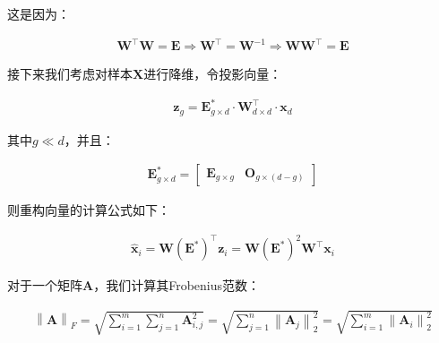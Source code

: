 \documentclass[UTF8]{book}
\begin{document}
这是因为：
\begin{large}
    \begin{equation}
        \begin{aligned}
            \mathbf{W}^\top\mathbf{W}=\mathbf{E} \Rightarrow \mathbf{W}^\top=\mathbf{W}^{-1} \Rightarrow \mathbf{W}\mathbf{W}^\top=\mathbf{E}
        \end{aligned}
    \end{equation}
\end{large}
接下来我们考虑对样本$\mathbf{X}$进行降维，令投影向量：
\begin{large}
    \begin{equation}
        \begin{aligned}
            \mathbf{z}_{g}=\mathbf{E}_{g \times d}^* \cdot \mathbf{W}_{d\times d}^\top \cdot \mathbf{x}_{d}
        \end{aligned}
    \end{equation}
\end{large}
其中$g \ll d$，并且：
\begin{large}
    \begin{equation}
        \begin{aligned}
            \mathbf{E}_{g\times d}^*=\begin{bmatrix}
            \mathbf{E}_{g\times g} & \mathbf{O}_{g\times (d-g)}
            \end{bmatrix}
            \nonumber
        \end{aligned}
    \end{equation}
\end{large}
则重构向量的计算公式如下：
\begin{large}
    \begin{equation}
        \begin{aligned}
            \hat{\mathbf{x}}_i=\mathbf{W} \left(\mathbf{E}^*\right)^\top \mathbf{z}_i = \mathbf{W}(\mathbf{E}^*)^2\mathbf{W}^\top \mathbf{x}_i
            \nonumber
        \end{aligned}
    \end{equation}
\end{large}
对于一个矩阵$\mathbf{A}$，我们计算其Frobenius范数：
\begin{large}
    \begin{equation}
        \begin{aligned}
            \left\| \mathbf{A} \right\|_F=\sqrt{\sum_{i=1}^{m}\sum_{j=1}^{n}\mathbf{A}_{i,j}^2}=\sqrt{\sum_{j=1}^{n} \left\| \mathbf{A}_j \right\|_2^2 }=\sqrt{\sum_{i=1}^{m} \left\| \mathbf{A}_i \right\|_2^2 }
            \nonumber
        \end{aligned}
    \end{equation}
\end{large}
\end{document}
